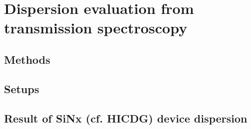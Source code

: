 
\chapter{Dispersion evaluation from transmission spectroscopy}
\section{Methods}
\section{Setups}
\section{Result of SiNx (cf. HICDG) device dispersion}
